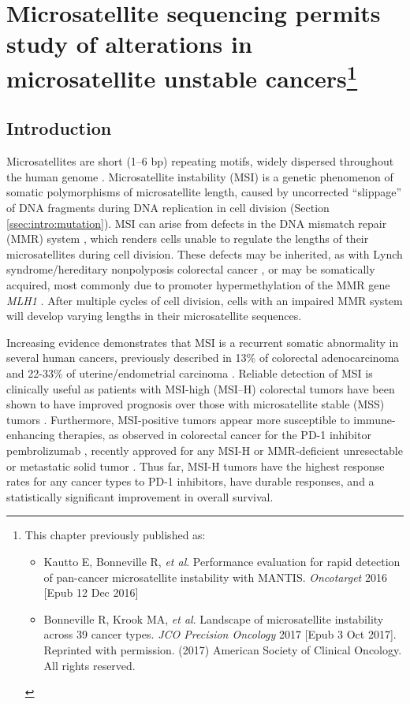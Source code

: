 \chapter[Microsatellite sequencing permits study of alterations in microsatellite unstable cancers]{Microsatellite sequencing permits study of alterations in microsatellite unstable cancers\footnote{This chapter previously published as: \begin{itemize} \item{Kautto E, Bonneville R, \textit{et al}. Performance evaluation for rapid detection of pan-cancer microsatellite instability with MANTIS\@. \textit{Oncotarget} 2016 [Epub 12 Dec 2016]} \item{Bonneville R\cofirst, Krook MA\cofirst, \textit{et al}. Landscape of microsatellite instability across 39 cancer types. \textit{JCO Precision Oncology} 2017 [Epub 3 Oct 2017]. Reprinted with permission. \textcopyright{} (2017) American Society of Clinical Oncology. All rights reserved.}\end{itemize}}}
\label{ch:msilandscape}

\section{Introduction}
Microsatellites are short (1--6 bp) repeating motifs, widely dispersed throughout the human genome \cite{kelkar2010}. Microsatellite instability (MSI) is a genetic phenomenon of somatic polymorphisms of microsatellite length, caused by uncorrected ``slippage'' of DNA fragments during DNA replication in cell division (Section \ref{ssec:intro:mutation}). MSI can arise from defects in the DNA mismatch repair (MMR) system \cite{shia2015}, which renders cells unable to regulate the lengths of their microsatellites during cell division. These defects may be inherited, as with Lynch syndrome/hereditary nonpolyposis colorectal cancer \cite{lynch1966,aaltonen1993}, or may be somatically acquired, most commonly due to promoter hypermethylation of the MMR gene \textit{MLH1} \cite{armaghany2012}. After multiple cycles of cell division, cells with an impaired MMR system will develop varying lengths in their microsatellite sequences.

Increasing evidence demonstrates that MSI is a recurrent somatic abnormality in several human cancers, previously described in 13\% of colorectal adenocarcinoma and 22-33\% of uterine/endometrial carcinoma \cite{dudley2016}. Reliable detection of MSI is clinically useful as patients with MSI-high (MSI–H) colorectal tumors have been shown to have improved prognosis over those with microsatellite stable (MSS) tumors \cite{buckowitz2005,benatti2005}. Furthermore, MSI-positive tumors appear more susceptible to immune-enhancing therapies, as observed in colorectal cancer for the PD-1 inhibitor pembrolizumab \cite{le2015}, recently approved for any MSI-H or MMR-deficient unresectable or metastatic solid tumor \cite{keytrudafda2017}. Thus far, MSI-H tumors have the highest response rates for any cancer types to PD-1 inhibitors, have durable responses, and a statistically significant improvement in overall survival.

